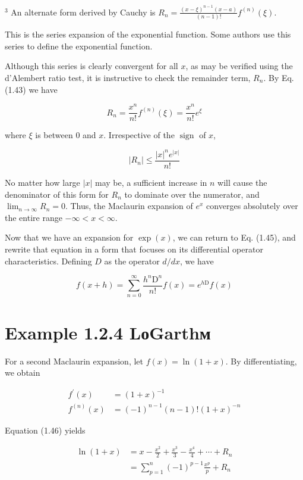 \documentclass[10pt]{article}
\begin{document}
${ }^{3}$ An alternate form derived by Cauchy is $R_{n}=\frac{(x-\xi)^{n-1}(x-a)}{(n-1)!} f^{(n)}(\xi)$.

This is the series expansion of the exponential function. Some authors use this series to define the exponential function.

Although this series is clearly convergent for all $x$, as may be verified using the d'Alembert ratio test, it is instructive to check the remainder term, $R_{n}$. By Eq. (1.43) we have

$$
R_{n}=\frac{x^{n}}{n!} f^{(n)}(\xi)=\frac{x^{n}}{n!} e^{\xi}
$$

where $\xi$ is between 0 and $x$. Irrespective of the $\operatorname{sign}$ of $x$,

$$
\left|R_{n}\right| \leq \frac{|x|^{n} e^{|x|}}{n!}
$$

No matter how large $|x|$ may be, a sufficient increase in $n$ will cause the denominator of this form for $R_{n}$ to dominate over the numerator, and $\lim _{n \rightarrow \infty} R_{n}=0$. Thus, the Maclaurin expansion of $e^{x}$ converges absolutely over the entire range $-\infty<x<\infty$.

Now that we have an expansion for $\exp (x)$, we can return to Eq. (1.45), and rewrite that equation in a form that focuses on its differential operator characteristics. Defining $D$ as the operator $d / d x$, we have


\begin{equation*}
f(x+h)=\sum_{n=0}^{\infty} \frac{h^{n} \mathrm{D}^{n}}{n!} f(x)=e^{h \mathrm{D}} f(x) \tag{1.48}
\end{equation*}


\section*{Example 1.2.4 LоGarthм}
For a second Maclaurin expansion, let $f(x)=\ln (1+x)$. By differentiating, we obtain


\begin{align*}
f^{\prime}(x) & =(1+x)^{-1} \\
f^{(n)}(x) & =(-1)^{n-1}(n-1)!(1+x)^{-n} \tag{1.49}
\end{align*}


Equation (1.46) yields


\begin{align*}
\ln (1+x) & =x-\frac{x^{2}}{2}+\frac{x^{3}}{3}-\frac{x^{4}}{4}+\cdots+R_{n} \\
& =\sum_{p=1}^{n}(-1)^{p-1} \frac{x^{p}}{p}+R_{n} \tag{1.50}
\end{align*}
\end{document}
